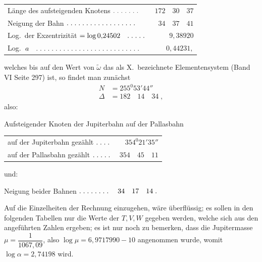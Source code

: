 \begin{landscape}
\begin{center}
\begin{tabular}{@{}l@{\quad}r@{}}
Länge des aufsteigenden Knotens \(\VSixPoint\VSixPoint\VSixPoint\VSixPoint\VSixPoint\VSixPoint\VSixPoint\)&\(172\quad30\quad37\)\\
Neigung der Bahn \(\VSixTenPoints\VSixPoint\VSixPoint\VSixPoint\VSixPoint\VSixPoint\VSixPoint\VSixPoint\VSixPoint\)&\(34\quad37\quad41\)\\
Log.\ der Exzentrizität \(=\log0{,}24502\quad\VSixPoint\VSixPoint\VSixPoint\VSixPoint\VSixPoint\)&\(9{,}38920\)\\
Log.\ \(a\quad\VSixTenPoints\VSixTenPoints\VSixPoint\VSixPoint\VSixPoint\VSixPoint\VSixPoint\VSixPoint\VSixPoint\)&\(0{,}44231,\)
\end{tabular}
\end{center}
\noindent welches bis auf den Wert von \(\tilde\omega\) das als X.\ bezeichnete Elementensystem (Band VI Seite 297) ist, so findet man zunächst
\[
\begin{aligned}
N&=255^0 53'44''\\
\Delta&=182\quad14\quad34\;,
\end{aligned}
\]
\noindent also:
\begin{center}
Aufsteigender Knoten der Jupiterbahn auf der Pallasbahn

\begin{tabular}{@{}l@{\quad}r@{}}
auf der Jupiterbahn gezählt \(\VSixPoint\VSixPoint\VSixPoint\VSixPoint\)&\(354^0 21'35''\)\\
auf der Pallasbahn gezählt \(\VSixPoint\VSixPoint\VSixPoint\VSixPoint\VSixPoint\)&\(354\quad45\quad11\)
\end{tabular}
\end{center}
\par\noindent\edef\VSixSavedIndent{\the\parindent}\begin{minipage}{\linewidth}\setlength{\parindent}{\VSixSavedIndent}
\noindent und:
\begin{center}
Neigung beider Bahnen \(\VSixPoint\VSixPoint\VSixPoint\VSixPoint\VSixPoint\VSixPoint\VSixPoint\VSixPoint\quad34\quad17\quad14\; .\)
\end{center}
\end{minipage}\par
\par\noindent\hspace*{\parindent}Auf die Einzelheiten der Rechnung einzugehen, wäre überflüssig; es sollen in den folgenden Tabellen nur die Werte der \(T,V,W\) gegeben werden, welche sich aus den angeführten Zahlen ergeben; es ist nur noch zu bemerken, dass die Jupitermasse \(\mu=\dfrac{1}{1067{,}09}\), also \(\log\mu=6{,}9717990-10\) angenommen wurde, womit \(\log\alpha=2{,}74198\) wird.
\clearpage
\endgroup
\end{landscape}

